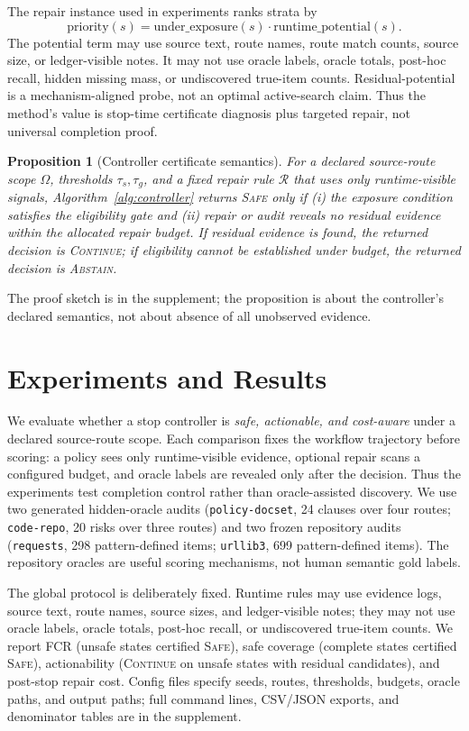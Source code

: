 \documentclass[letterpaper,10pt,twocolumn]{article}
\newcommand{\safe}{\textsc{Safe}}
\newcommand{\cont}{\textsc{Continue}}
\newcommand{\abstain}{\textsc{Abstain}}
\newcommand{\OmegaSR}{\Omega}
\newtheorem{proposition}{Proposition}
\begin{document}
The repair instance used in experiments ranks strata by
\[
\mathrm{priority}(s)=\mathrm{under\_exposure}(s)\cdot
\mathrm{runtime\_potential}(s).
\]
The potential term may use source text, route names, route match counts, source
size, or ledger-visible notes. It may not use oracle labels, oracle totals,
post-hoc recall, hidden missing mass, or undiscovered true-item counts.
Residual-potential is a mechanism-aligned probe, not an optimal active-search
claim. Thus the method's value is stop-time certificate diagnosis plus targeted
repair, not universal completion proof.

\begin{proposition}[Controller certificate semantics]
For a declared source-route scope \(\OmegaSR\), thresholds
\(\tau_s,\tau_g\), and a fixed repair rule \(\mathcal{R}\) that uses only
runtime-visible signals, Algorithm~\ref{alg:controller} returns \safe{} only if
(i) the exposure condition satisfies the eligibility gate and (ii) repair or
audit reveals no residual evidence within the allocated repair budget. If
residual evidence is found, the returned decision is \cont{}; if eligibility
cannot be established under budget, the returned decision is \abstain{}.
\end{proposition}

The proof sketch is in the supplement; the proposition is about the controller's
declared semantics, not about absence of all unobserved evidence.

\section{Experiments and Results}

We evaluate whether a stop controller is \emph{safe, actionable, and
cost-aware} under a declared source-route scope. Each comparison fixes the
workflow trajectory before scoring: a policy sees only runtime-visible evidence,
optional repair scans a configured budget, and oracle labels are revealed only
after the decision. Thus the experiments test completion control rather than
oracle-assisted discovery. We use two generated hidden-oracle audits
(\texttt{policy-docset}, 24 clauses over four routes; \texttt{code-repo}, 20
risks over three routes) and two frozen repository audits (\texttt{requests},
298 pattern-defined items; \texttt{urllib3}, 699 pattern-defined items). The
repository oracles are useful scoring mechanisms, not human semantic gold
labels.

The global protocol is deliberately fixed. Runtime rules may use evidence logs,
source text, route names, source sizes, and ledger-visible notes; they may not
use oracle labels, oracle totals, post-hoc recall, or undiscovered true-item
counts. We report FCR (unsafe states certified \safe{}), safe coverage
(complete states certified \safe{}), actionability (\cont{} on unsafe states
with residual candidates), and post-stop repair cost. Config files specify
seeds, routes, thresholds, budgets, oracle paths, and output paths; full command
lines, CSV/JSON exports, and denominator tables are in the supplement.
\end{document}
